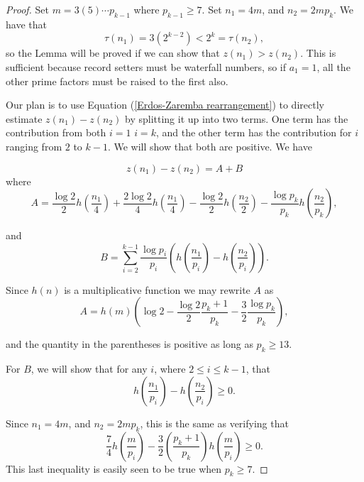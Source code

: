 \documentclass[10pt,a4paper]{amsart}
\begin{document}
\begin{proof} 
Set $m=3(5)\cdots p_{k-1}$ where $p_{k-1} \geq 7$. Set
$n_1= 4m$, and $n_2=2mp_k$. We have that $$\tau(n_1) = 3 (2^{k-2}) < 2^k = \tau(n_2),$$ so the Lemma will be proved if we can show that
$z(n_1) > z(n_2).$ This is sufficient because record setters must be waterfall numbers, so if $a_1=1$, all the other prime factors must be raised to the first also.

Our plan is to use Equation (\ref{Erdos-Zaremba rearrangement})  to directly estimate $z(n_1)-z(n_2)$ by splitting it up into two terms. One term has the contribution from both $i=1$ $i=k$, and the other term has the contribution for $i$ ranging from $2$ to $k-1$. We will show that both are positive. We have 

$$z(n_1) - z(n_2) = A+B$$
where $$A= \frac{\log 2}{2}h\left(\frac{n_1}{4}\right) + \frac{2\log2}{4}h\left(\frac{n_1}{4}\right) - \frac{\log 2}{2}h\left(\frac{n_2}{2}\right) - \frac{\log p_k}{p_k}h\left(\frac{n_2}{p_k}\right),  $$

and $$B= \sum_{i=2}^{k-1} \frac{\log p_i}{p_i}\left(h\left(\frac{n_1}{p_i}\right) -h\left(\frac{n_2}{p_i}\right)\right). $$

Since $h(n)$ is a multiplicative function we may rewrite $A$ as 
$$A=h(m)\left(\log 2 - \frac{\log 2}{2} \frac{p_k+1}{p_k} - \frac{3}{2} \frac{\log p_k}{p_k} \right),$$

and the quantity in the parentheses is positive as long as $p_k \geq 13$.

For $B$, we will show that for any $i$, where $2 \leq i \leq k-1$,
that $$h\left(\frac{n_1}{p_i}\right) - h\left(\frac{n_2}{p_i}\right) \geq 0.$$

Since $n_1 = 4m$, and $n_2 = 2mp_k$, this is the same as verifying that 
$$\frac{7}{4}h\left(\frac{m}{p_i}\right) - \frac{3}{2}\left(\frac{p_k+1}{p_k}\right)h\left(\frac{m}{p_i}\right) \geq 0.$$ This last inequality is easily seen to be true when $p_k \geq 7$.

\end{proof}
\end{document}
